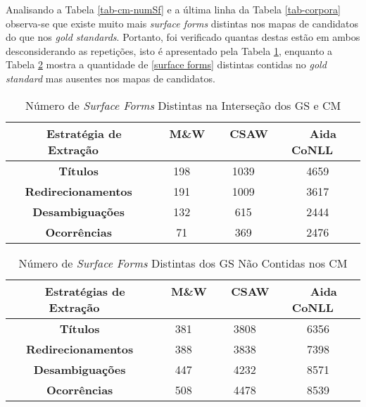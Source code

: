 \documentclass[10pt,a4paper]{llncs}
\begin{document}
{Analisando a Tabela \ref{tab-cm-numSf} e a última linha da Tabela \ref{tab-corpora} observa-se que existe muito mais \textit{surface forms} distintas nos mapas de candidatos do que nos \textit{gold standards}. Portanto, foi verificado quantas destas estão em ambos desconsiderando as repetições, isto é apresentado pela Tabela \ref{tab-metrica1}, enquanto a Tabela \ref{tab-metrica4} mostra a quantidade de \ref{surface forms} distintas contidas no \textit{gold standard} mas ausentes nos mapas de candidatos.
\begin{table} \label{tab-metrica1}
\caption{Número de \textit{Surface Forms} Distintas na Interseção dos GS e CM}
\centering
    \begin{tabular}{|c|c|c|c|}
    \hline
    ~ {\bf Estratégia de Extração} ~ 	& ~ {\bf M\&W} ~ 	& ~ {\bf CSAW} ~ 	& ~ {\bf Aida CoNLL} ~\\ \hline  
    {\bf Títulos} 			& 198			& 1039			& 4659 \\ \hline
    {\bf Redirecionamentos} 		& 191			& 1009			& 3617 \\ \hline
    {\bf Desambiguações} 		& 132			& 615			& 2444 \\ \hline
    {\bf Ocorrências} 			& 71			& 369			& 2476 \\ \hline
    \end{tabular}
\end{table}
\begin{table} \label{tab-metrica4}
\caption{Número de \textit{Surface Forms} Distintas dos GS Não Contidas nos CM}
\centering
    \begin{tabular}{|c|c|c|c|}
    \hline
    ~ {\bf Estratégias de Extração} ~ 	& ~ {\bf M\&W} ~ 	& ~ {\bf CSAW} ~ 	& ~ {\bf Aida CoNLL} ~\\ \hline  
    {\bf Títulos} 			& 381			& 3808			& 6356 \\ \hline
    {\bf Redirecionamentos} 		& 388			& 3838			& 7398 \\ \hline
    {\bf Desambiguações} 		& 447			& 4232			& 8571 \\ \hline
    {\bf Ocorrências} 			& 508			& 4478			& 8539 \\ \hline
    \end{tabular}
\end{table}

}
\end{document}
